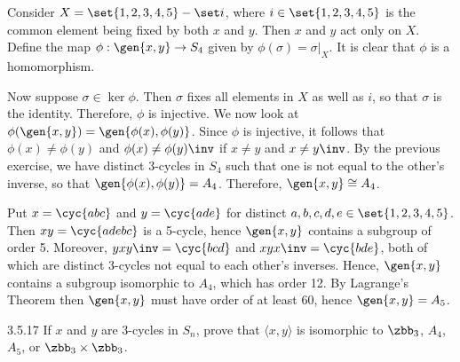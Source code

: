 \begin{solenum}
    \item Consider $X = \set{1, 2, 3, 4, 5} - \set i$, where $i \in \set{1, 2, 3, 4, 5}$ is the common element being fixed by both $x$ and $y$.
	Then $x$ and $y$ act only on $X$.
	Define the map $\phi : \gen{x, y} \to S_4$ given by $\phi(\sigma) = \sigma|_X$.
	It is clear that $\phi$ is a homomorphism. 
    
    Now suppose $\sigma \in \ker\phi$.
	Then $\sigma$ fixes all elements in $X$ as well as $i$, so that $\sigma$ is the identity.
	Therefore, $\phi$ is injective.
	We now look at $\phi(\gen{x, y}) = \gen{\phi(x), \phi(y)}$.
	Since $\phi$ is injective, it follows that $\phi(x) \neq \phi(y)$ and $\phi(x) \neq \phi(y)\inv$ if $x \neq y$ and $x \neq y\inv$.
	By the previous exercise, we have distinct 3-cycles in $S_4$ such that one is not equal to the other's inverse, so that $\gen{\phi(x), \phi(y)} = A_4$.
	Therefore, $\gen{x, y} \cong A_4$.
    \item Put $x = \cyc{a b c}$ and $y = \cyc{a d e}$ for distinct $a, b, c, d, e \in \set{1, 2, 3, 4, 5}$.
	Then $xy = \cyc{a d e b c}$ is a 5-cycle, hence $\gen{x, y}$ contains a subgroup of order 5.
	Moreover, $yxy\inv = \cyc{b c d}$ and $xyx\inv = \cyc{b d e}$, both of which are distinct 3-cycles not equal to each other's inverses.
	Hence, $\gen{x, y}$ contains a subgroup isomorphic to $A_4$, which has order 12.
	By Lagrange's Theorem then $\gen{x, y}$ must have order of at least 60, hence $\gen{x, y} = A_5$.
\end{solenum}

\begin{exercise}{3.5.17}
    If $x$ and $y$ are $3$-cycles in $S_n$, prove that $\langle x,y\rangle$ is isomorphic to $\zbb_3$, $A_4$, $A_5$, or $\zbb_3\times\zbb_3$.
\end{exercise}

